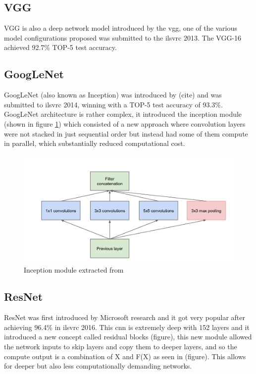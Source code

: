 \subsection{VGG}
VGG is also a deep network model introduced by the \gls{vgg}, one of the various model configurations proposed \cite{DBLP:journals/corr/SimonyanZ14a} was submitted to the \gls{ilsvrc} 2013. The VGG-16 achieved 92.7\% TOP-5 test accuracy.

\subsection{GoogLeNet}
GoogLeNet (also known as Inception) was introduced by (cite) and was submitted to \gls{ilsvrc} 2014, winning with a TOP-5 test accuracy of 93.3\%. GoogLeNet architecture is rather complex, it introduced the inception module (shown in figure \ref{inception}) which consisted of a new approach where convolution layers were not stacked in just sequential order but instead had some of them compute in parallel, which substantially reduced computational cost.

\begin{figure}
	\includegraphics[scale=0.3]{archivos/inception_module.png}
	\centering
	\caption{Inception module extracted from \cite{DBLP:journals/corr/SzegedyLJSRAEVR14}}
	\label{inception}
\end{figure}

\subsection{ResNet}
ResNet was first introduced by Microsoft research and it got very popular after achieving 96.4\% in \gls{ilsvrc} 2016. This \gls{cnn} is extremely deep with 152 layers and it introduced a new concept called residual blocks (figure), this new module allowed the network inputs to skip layers and copy them to deeper layers, and so the compute output is a combination of X and F(X) as seen in (figure). This allows for deeper but also less computationally demanding networks.

